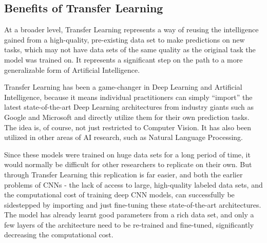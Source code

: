 	\subsection{Benefits of Transfer Learning}
	\begin{bulletedlist}
		\item At a broader level, Transfer Learning represents a way of reusing the intelligence gained from a high-quality, pre-existing data set to make predictions on new tasks, which may not have data sets of the same quality as the original task the model was trained on. It represents a significant step on the path to a more generalizable form of Artificial Intelligence.
		\item Transfer Learning has been a game-changer in Deep Learning and Artificial Intelligence, because it means individual practitioners can simply ``import'' the latest state-of-the-art Deep Learning architectures from industry giants such as Google and Microsoft and directly utilize them for their own prediction tasks.  The idea is, of course, not just restricted to Computer Vision. It has also been utilized in other areas of AI research, such as Natural Language Processing.
		\item Since these models were trained on huge data sets for a long period of time, it would normally be difficult for other researchers to replicate on their own.  But through Transfer Learning this replication is far easier, and both the earlier problems of CNNs - the lack of access to large, high-quality labeled data sets, and the computational cost of training deep CNN models, can successfully be sidestepped by importing and just fine-tuning these state-of-the-art architectures. The model has already learnt good parameters from a rich data set, and only a few layers of the architecture need to be re-trained and fine-tuned, significantly decreasing the computational cost.
	\end{bulletedlist}


